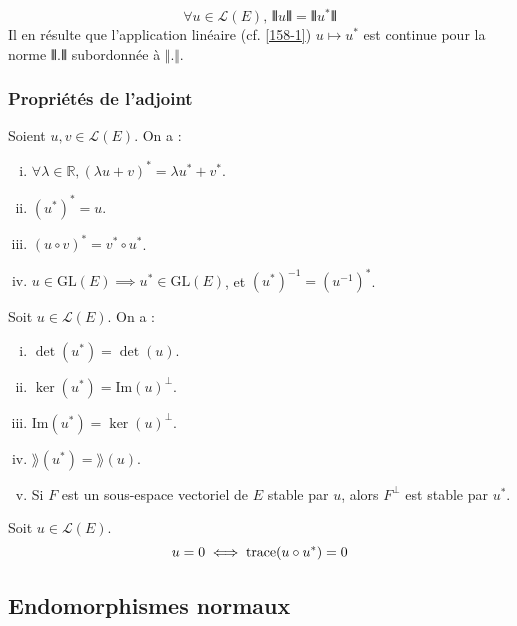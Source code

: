 	\begin{proposition}
		\[ \forall u \in \mathcal{L}(E), \, \VERT u \VERT = \VERT u^* \VERT \]
		Il en résulte que l'application linéaire (cf. \cref{158-1}) $u \mapsto u^*$ est continue pour la norme $\VERT . \VERT$ subordonnée à $\Vert . \Vert$.
	\end{proposition}
	
	\subsubsection{Propriétés de l'adjoint}
	
	
	\begin{proposition}
		\label{158-1}
		Soient $u, v \in \mathcal{L}(E)$. On a :
		\begin{enumerate}[(i)]
			\item $\forall \lambda \in \mathbb{R}, (\lambda u + v)^* = \lambda u^* + v^*$.
			\item $(u^*)^* = u$.
			\item $(u \circ v)^* = v^* \circ u^*$.
			\item $u \in \mathrm{GL}(E) \implies u^* \in \mathrm{GL}(E)$, et $(u^*)^{-1} = (u^{-1})^*$.
		\end{enumerate}
	\end{proposition}
	
	\begin{proposition}
		Soit $u \in \mathcal{L}(E)$. On a :
		\begin{enumerate}[(i)]
			\item $\det(u^*) = \det(u)$.
			\item $\ker(u^*) = \mathrm{Im}(u)^\perp$.
			\item $\mathrm{Im}(u^*) = \ker(u)^\perp$.
			\item $\rang(u^*) = \rang(u)$.
			\item Si $F$ est un sous-espace vectoriel de $E$ stable par $u$, alors $F^\perp$ est stable par $u^*$.
		\end{enumerate}
	\end{proposition}
	
	
	\begin{proposition}
		Soit $u \in \mathcal{L}(E)$.
		\[ u = 0 \iff \operatorname{trace}(u \circ u^*) = 0 \]
	\end{proposition}
	
	\subsection{Endomorphismes normaux}
	
